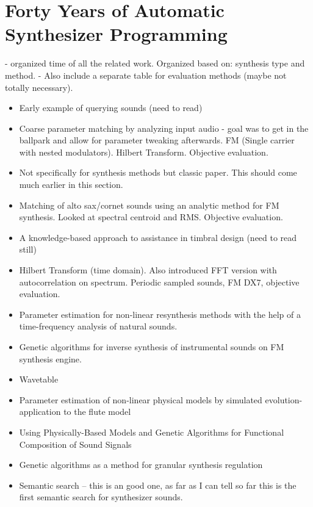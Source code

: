\section{Forty Years of Automatic Synthesizer Programming}
- organized time of all the related work. Organized based on: synthesis type and method.
- Also include a separate table for evaluation methods (maybe not totally necessary).

\begin{itemize}
	\item \cite{zloof1977query} Early example of querying sounds (need to read)
	\item \cite{justice1979analytic} Coarse parameter matching by analyzing input audio - goal was to get in the ballpark and allow for parameter tweaking afterwards. FM (Single carrier with nested modulators). Hilbert Transform. Objective evaluation.
	\item \cite{wessel1979timbre} Not specifically for synthesis methods but classic paper. This should come much earlier in this section.
	\item \cite{beauchamp1982synthesis} Matching of alto sax/cornet sounds using an analytic method for FM synthesis. Looked at spectral centroid and RMS. Objective evaluation.
	\item \cite{ashley1986knowledge} A knowledge-based approach to assistance in timbral design (need to read still)
	\item \cite{payne1987microcomputer} Hilbert Transform (time domain). Also introduced FFT version with autocorrelation on spectrum. Periodic sampled sounds, FM DX7, objective evaluation.
	\item \cite{delprat1990parameter} Parameter estimation for non-linear resynthesis methods with the help of a time-frequency analysis of natural sounds.
	\item \cite{horner1993machine} Genetic algorithms for inverse synthesis of instrumental sounds on FM synthesis engine.
	\item \cite{horner1993methods} Wavetable
	\item \cite{vuori1993parameter} Parameter estimation of non-linear physical models by simulated evolution-application to the flute model
	\item \cite{takala1993using} Using Physically-Based Models and Genetic Algorithms for Functional Composition of Sound Signals
	\item \cite{fujinaga1994genetic} Genetic algorithms as a method for granular synthesis regulation
	\item \cite{ethington1994seawave} Semantic search -- this is an good one, as far as I can tell so far this is the first semantic search for synthesizer sounds.

\end{itemize}
